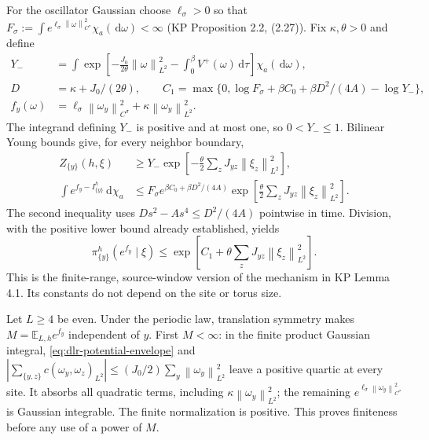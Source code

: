 \documentclass[11pt]{article}
\numberwithin{equation}{section}
\theoremstyle{definition}
\newcommand{\E}{\mathbb E}
\newcommand{\dd}{\,\mathrm d}
\newcommand{\norm}[1]{\left\lVert#1\right\rVert}
\begin{document}
For the oscillator Gaussian choose $\ell_\sigma>0$ so that
$F_\sigma:=\int e^{\ell_\sigma\norm{\omega}_{C^\sigma}^2}
\chi_a(\dd\omega)<\infty$ (KP Proposition 2.2, (2.27)).
Fix $\kappa,\theta>0$ and define
\begin{align}
 Y_-&=\int\exp\left[-\frac{J_0}{2\theta}\norm{\omega}_{L^2}^2
                   -\int_0^\beta V^+(\omega)\dd\tau\right]
                   \chi_a(\dd\omega),\nonumber\\
 D&=\kappa+J_0/(2\theta),\qquad
 C_1=\max\{0,\log F_\sigma+\beta C_0+\beta D^2/(4A)-\log Y_-\},
 \nonumber\\
 f_y(\omega)&=\ell_\sigma\norm{\omega_y}_{C^\sigma}^2
                         +\kappa\norm{\omega_y}_{L^2}^2.
 \label{eq:one-site-constants}
\end{align}
The integrand defining $Y_-$ is positive and at most one, so
$0<Y_-\leq1$.  Bilinear Young bounds give, for every neighbor boundary,
\begin{align*}
 Z_{\{y\}}(h,\xi)&\geq
 Y_-\exp\left[-\frac\theta2\sum_zJ_{yz}\norm{\xi_z}_{L^2}^2\right],\\
 \int e^{f_y-I_{\{y\}}^h}\dd\chi_a&\leq
 F_\sigma e^{\beta C_0+\beta D^2/(4A)}
 \exp\left[\frac\theta2\sum_zJ_{yz}\norm{\xi_z}_{L^2}^2\right].
\end{align*}
The second inequality uses $D s^2-A s^4\leq D^2/(4A)$ pointwise
in time.  Division, with the positive lower bound already established, yields
\begin{equation}
 \pi_{\{y\}}^h(e^{f_y}\mid\xi)
 \leq\exp\left[C_1+\theta\sum_zJ_{yz}\norm{\xi_z}_{L^2}^2\right].
 \label{eq:one-site-exponential}
\end{equation}
This is the finite-range, source-window version of the mechanism in KP
Lemma 4.1.  Its constants do not depend on the site or torus size.

Let $L\geq4$ be even.  Under the periodic law, translation symmetry makes
$M=\E_{L,h}e^{f_y}$ independent of $y$.  First $M<\infty$: in the
finite product Gaussian integral, \eqref{eq:dlr-potential-envelope} and
$|\sum_{\{y,z\}}c(\omega_y,\omega_z)_{L^2}|
\leq (J_0/2)\sum_y\norm{\omega_y}_{L^2}^2$ leave a positive quartic
at every site.  It absorbs all quadratic terms, including
$\kappa\norm{\omega_y}_{L^2}^2$; the remaining
$e^{\ell_\sigma\norm{\omega_y}_{C^\sigma}^2}$ is Gaussian integrable.
The finite normalization is positive.  This proves finiteness before any
use of a power of $M$.
\end{document}
